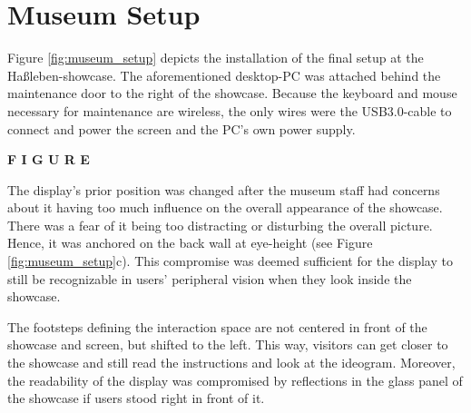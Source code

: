 
\section{Museum Setup}
\label{setup_museum}

Figure \ref{fig:museum_setup} depicts the installation of the final setup at the Haßleben-showcase. The aforementioned desktop-PC was attached behind the maintenance door to the right of the showcase. Because the keyboard and mouse necessary for maintenance are wireless, the only wires were the USB3.0-cable to connect and power the screen and the PC's own power supply. 

\textbf{F I G U R E}

The display's prior position was changed after the museum staff had concerns about it having too much influence on the overall appearance of the showcase. There was a fear of it being too distracting or disturbing the overall picture. Hence, it was anchored on the back wall at eye-height (see Figure \ref{fig:museum_setup}c). This compromise was deemed sufficient for the display to still be recognizable in users' peripheral vision when they look inside the showcase.

The footsteps defining the interaction space are not centered in front of the showcase and screen, but shifted to the left. This way, visitors can get closer to the showcase and still read the instructions and look at the ideogram. Moreover, the readability of the display was compromised by reflections in the glass panel of the showcase if users stood right in front of it.


